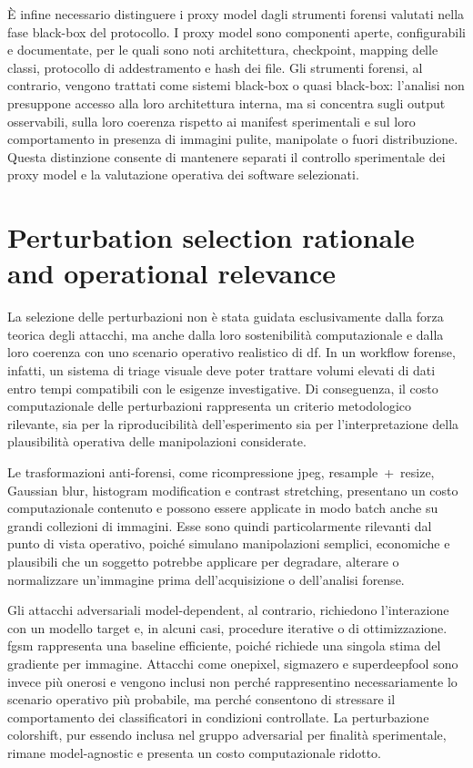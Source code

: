 È infine necessario distinguere i proxy model dagli strumenti forensi valutati
nella fase black-box del protocollo. I proxy model sono componenti aperte,
configurabili e documentate, per le quali sono noti architettura, checkpoint,
mapping delle classi, protocollo di addestramento e hash dei file. Gli strumenti
forensi, al contrario, vengono trattati come sistemi black-box o quasi
black-box: l'analisi non presuppone accesso alla loro architettura interna, ma
si concentra sugli output osservabili, sulla loro coerenza rispetto ai manifest
sperimentali e sul loro comportamento in presenza di immagini pulite,
manipolate o fuori distribuzione. Questa distinzione consente di mantenere
separati il controllo sperimentale dei proxy model e la valutazione operativa
dei software selezionati.


\section{Perturbation selection rationale and operational relevance}
\label{sec:methodology-perturbation-selection-rationale}

La selezione delle perturbazioni non è stata guidata esclusivamente dalla
forza teorica degli attacchi, ma anche dalla loro sostenibilità computazionale
e dalla loro coerenza con uno scenario operativo realistico di \gls{df}. In un
workflow forense, infatti, un sistema di triage visuale deve poter trattare
volumi elevati di dati entro tempi compatibili con le esigenze investigative.
Di conseguenza, il costo computazionale delle perturbazioni rappresenta un criterio
metodologico rilevante, sia per la riproducibilità dell'esperimento sia per
l'interpretazione della plausibilità operativa delle manipolazioni considerate.

Le trasformazioni anti-forensi, come ricompressione \gls{jpeg},
resample~+~resize, Gaussian blur, histogram modification e contrast stretching,
presentano un costo computazionale contenuto e possono essere applicate in modo
batch anche su grandi collezioni di immagini. Esse sono quindi particolarmente
rilevanti dal punto di vista operativo, poiché simulano manipolazioni semplici,
economiche e plausibili che un soggetto potrebbe applicare per degradare,
alterare o normalizzare un'immagine prima dell'acquisizione o dell'analisi
forense.

Gli attacchi adversariali model-dependent, al contrario, richiedono
l'interazione con un modello target e, in alcuni casi, procedure iterative o di
ottimizzazione. \gls{fgsm} rappresenta una baseline efficiente, poiché richiede
una singola stima del gradiente per immagine. Attacchi come \gls{onepixel}, \gls{sigmazero} e \gls{superdeepfool} sono invece
più onerosi e vengono inclusi non perché rappresentino necessariamente lo
scenario operativo più probabile, ma perché consentono di stressare il
comportamento dei classificatori in condizioni controllate. La perturbazione
\gls{colorshift}, pur essendo inclusa nel gruppo adversarial per finalità
sperimentale, rimane model-agnostic e presenta un costo computazionale ridotto.

